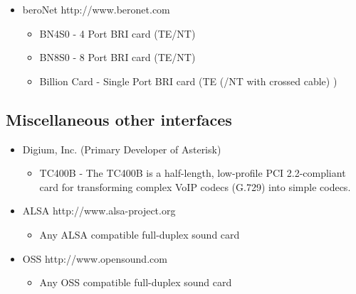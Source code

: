 \begin{itemize}
  \item beroNet 
	http://www.beronet.com
  \begin{itemize}
    \item BN4S0 - 4 Port BRI card (TE/NT)

    \item BN8S0 - 8 Port BRI card (TE/NT)

    \item Billion Card - Single Port BRI card (TE (/NT with crossed cable) )
   \end{itemize}
\end{itemize}

\subsection{Miscellaneous other interfaces}

\begin{itemize}
  \item Digium, Inc. (Primary Developer of Asterisk)
  \begin{itemize}
    \item TC400B - The TC400B is a half-length, low-profile PCI 2.2-compliant card for transforming complex VoIP codecs (G.729) into simple codecs.
  \end{itemize}

  \item ALSA
        http://www.alsa-project.org
  \begin{itemize}
    \item Any ALSA compatible full-duplex sound card
  \end{itemize}

  \item OSS
        http://www.opensound.com
  \begin{itemize}
    \item Any OSS compatible full-duplex sound card
  \end{itemize}
\end{itemize}
